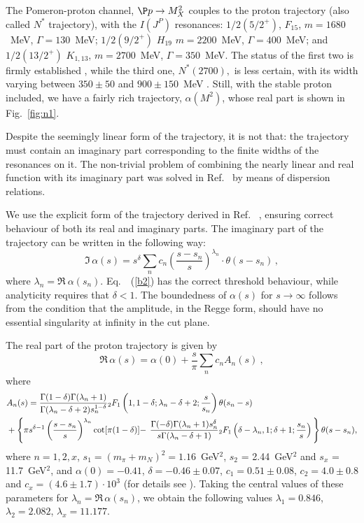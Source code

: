 \documentclass[12pt]{article}
\begin{document}
The Pomeron-proton channel, $\P p\rightarrow M_X^2$  couples to the
proton trajectory (also called $N^{*}$ trajectory), with the $I(J^P)$ resonances: $1/2(5/2^+)$,
$F_{15}$, $m=1680$~MeV, $\Gamma=130$~MeV; $1/2(9/2^+)$ $H_{19}$ 
$m=2200$~MeV, $\Gamma=400$~MeV; and $1/2(13/2^+)$ $K_{1,13}$,
$m=2700$~MeV, $\Gamma=350$~MeV.
The status of the first two is
firmly established \cite{particles}, while the third one,
$N^*(2700),$ is less certain, with its width varying between
$350\pm 50$ and $900\pm 150$~MeV . Still, with the
stable proton included, we have a fairly rich trajectory,
$\alpha(M^2)$, whose real part is shown in Fig.~\ref{fig:n1}.


Despite the seemingly linear form of the trajectory, it is not
that: the trajectory must contain an imaginary part corresponding
to the finite widths of the resonances on it. The non-trivial
problem of combining the nearly linear and real function with its
imaginary part was solved in Ref.~\cite{Paccanoni} by means of
dispersion relations.

We use  the explicit form of the trajectory derived in Ref.~
\cite{Paccanoni}, ensuring  correct behaviour of both its real and
imaginary parts. The imaginary part of the trajectory can be
written in the following way:
\begin{equation}
\Im\, \alpha(s)=s^{\delta} \sum_n c_n
\left(\frac{s-s_n}{s}\right)^{\lambda_n} \cdot \theta(s-s_n)\,,
\label{b2}
\end{equation}
where $\lambda_n=\Re\ \alpha(s_n)$. Eq.~~(\ref{b2}) has the
correct threshold behaviour, while analyticity requires that
$\delta <1$. The boundedness of $\alpha(s)$ for $s \to \infty$
follows from the condition that the amplitude, in the Regge form,
should have no essential singularity at infinity in the cut plane.

The real part of the proton trajectory is given by
\begin{equation}
\Re\,\alpha(s)=\alpha(0)+\frac{s}{\pi}\sum_n c_n {A}_n(s)~, \label{b3}
\end{equation}
where
\begin{eqnarray}
 &{A}_n(s)=
\frac{\Gamma(1-\delta)\Gamma(\lambda_n+1)}{\Gamma(\lambda_n-\delta+2)
s_n^{1-\delta}}{}_2F_1\left(1,1-\delta;\lambda_n-\delta+2;\frac{s}{s_n}\right)\theta(s_n-s)\\ \nonumber
&+\left\{ \pi s^{\delta-1}\left(\frac{s-s_n}{s}\right)^{\lambda_n} \cot[\pi(1-\delta)]- \right. 
\left.\frac{\Gamma(-\delta)\Gamma(\lambda_n+1)s_n^{\delta}}{s\Gamma(\lambda_n-\delta+1)
}{}_2F_1\left(\delta-\lambda_n,1;\delta+1;\frac{s_n}{s}\right)
\vphantom{\left( \frac{s-s_n}{s}\right)^{\lambda_n}} \right \}
\theta(s-s_n),
\end{eqnarray}
where  $n=1,2,x$, $s_1=(m_{\pi}+m_N)^2=1.16$~GeV$^2$, $s_2$ = 2.44~GeV$^2$ and
$s_x$ = 11.7~GeV$^2$, and 
$\alpha(0)=-0.41$, $\delta = -0.46 \pm 0.07$, $c_1=0.51\pm 0.08$, $c_2=4.0\pm 0.8$ and $c_x=(4.6 \pm 1.7)\cdot
10^{3}$ (for details see \cite{JMPx}). 
Taking the central values of these parameters for $\lambda_n=\Re\, \alpha(s_n)$,  we obtain
the following values $\lambda_1=0.846$, $\lambda_2=2.082$, $\lambda_x=11.177$.
\end{document}
